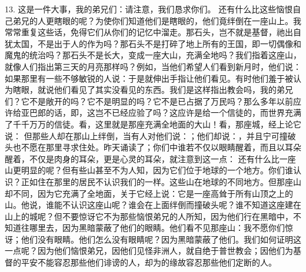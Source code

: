 13.  这是一件大事，我的弟兄们：请注意，我们恳求你们。 还有什么比这些恼恨自己弟兄的人更瞎眼的呢？为使你们知道他们是瞎眼的，他们竟绊倒在一座山上。我常常重复这些话，免得它们从你们的记忆中溜走。那石头，岂不就是基督，祂出自犹太国，不是出于人的作为吗？那石头不是打碎了地上所有的王国，即一切偶像和魔鬼的统治吗？那石头不是长大，变成一座大山，充满全地吗？我们指着这座山，就像人们指出第三天的月亮那样吗？例如，当他们希望人们看到新月时，他们说：如果那里有一些不够敏锐的人说：于是就伸出手指让他们看见。有时他们羞于被认为瞎眼，就说他们看见了其实没看见的东西。我们是这样指出教会吗，我的弟兄们？它不是敞开的吗？它不是明显的吗？它不是已占据了万民吗？那么多年以前应许给亚巴郎的话，即，这岂不已经应验了吗？这应许是给一个信徒的，而世界充满了千千万万的信徒。看，这里就是那座充满全地面的大山！看，那座城，经上论它说： 但那些人却在那山上绊倒，当有人对他们说：；他们却说：，并且宁可撞破头也不愿在那里寻求住处。昨天诵读了；你们中谁若不仅以眼睛醒着，而且以耳朵醒着，不仅是肉身的耳朵，更是心灵的耳朵，就注意到这一点： 还有什么比一座山更明显的呢？但有些山甚至不为人知，因为它们位于地球的一个地方。你们谁认识？正如住在那里的居民不认识我们的一样。这些山在地球的不同地方。但那座山却不同，因为它充满了全地面，关于它经上说：它是一座高耸于所有山顶之上的山。他说，谁能不认识这座山呢？谁会在上面绊倒而撞破头呢？谁不知道这座建在山上的城呢？但不要惊讶它不为那些恼恨弟兄的人所知，因为他们行在黑暗中，不知道往哪里去，因为黑暗蒙蔽了他们的眼睛。他们看不见那座山：我不愿你们惊讶；他们没有眼睛。他们怎么没有眼睛呢？因为黑暗蒙蔽了他们。我们如何证明这一点呢？因为他们恼恨弟兄，因他们见怪非洲人，就自绝于普世教会；因他们为基督的平安不能容忍那些他们诽谤的人，却为的缘故容忍那些他们定断的人。\par



